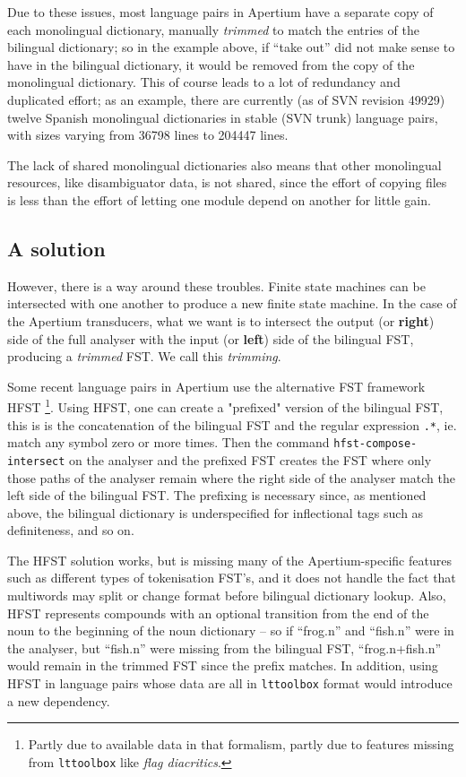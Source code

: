 \documentclass[10pt, a4paper]{article}
\begin{document}
Due to these issues, most language pairs in Apertium have a separate
copy of each monolingual dictionary, manually \emph{trimmed} to match
the entries of the bilingual dictionary; so in the example above, if
``take out'' did not make sense to have in the bilingual dictionary,
it would be removed from the copy of the monolingual dictionary. This
of course leads to a lot of redundancy and duplicated effort; as an
example, there are currently (as of SVN revision 49929) twelve Spanish
monolingual dictionaries in stable (SVN trunk) language pairs, with
sizes varying from 36798 lines to 204447 lines.

The lack of shared monolingual dictionaries also means that other
monolingual resources, like disambiguator data, is not shared, since
the effort of copying files is less than the effort of letting one
module depend on another for little gain.

\subsection{A solution}

However, there is a way around these troubles. Finite state machines
can be intersected with one another to produce a new finite state
machine. In the case of the Apertium transducers, what we want is to
intersect the output (or \textbf{right}) side of the full analyser
with the input (or \textbf{left}) side of the bilingual FST, producing
a \emph{trimmed} FST. We call this \emph{trimming}.

Some recent language pairs in Apertium use the alternative FST
framework HFST \cite{linden2011hfst}\footnote{Partly due to available
data in that formalism, partly due to features missing from
\texttt{lttoolbox} like \emph{flag diacritics}.}. Using HFST, one can
create a "prefixed" version of the bilingual FST, this is is the
concatenation of the bilingual FST and the regular expression
\texttt{.*}, ie. match any symbol zero or more times. Then the command
\texttt{hfst-compose-intersect} on the analyser and the prefixed FST
creates the FST where only those paths of the analyser remain where
the right side of the analyser match the left side of the bilingual
FST. The prefixing is necessary since, as mentioned above, the
bilingual dictionary is underspecified for inflectional tags such as
definiteness, and so on.

The HFST solution works, but is missing many of the Apertium-specific
features such as different types of tokenisation FST's, and it does
not handle the fact that multiwords may split or change format before
bilingual dictionary lookup. Also, HFST represents compounds with an
optional transition from the end of the noun to the beginning of the
noun dictionary -- so if ``frog.n'' and ``fish.n'' were in the
analyser, but ``fish.n'' were missing from the bilingual FST,
``frog.n+fish.n'' would remain in the trimmed FST since the prefix
matches.  In addition, using HFST in language pairs whose data are all
in \texttt{lttoolbox} format would introduce a new dependency.
\end{document}

